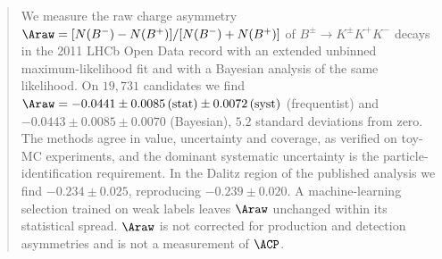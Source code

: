 \begin{abstract}
We measure the raw charge asymmetry $\Araw=[N(B^-)-N(B^+)]/[N(B^-)+N(B^+)]$ of $B^{\pm}\to K^{\pm}K^{+}K^{-}$ decays in the 2011 LHCb Open Data record with an extended unbinned maximum-likelihood fit and with a Bayesian analysis of the same likelihood. On $19{,}731$ candidates we find $\Araw=-0.0441\pm0.0085\,(\text{stat})\pm0.0072\,(\text{syst})$ (frequentist) and $-0.0443\pm0.0085\pm0.0070$ (Bayesian), $5.2$ standard deviations from zero. The methods agree in value, uncertainty and coverage, as verified on toy-MC experiments, and the dominant systematic uncertainty is the particle-identification requirement. In the Dalitz region of the published analysis we find $-0.234\pm0.025$, reproducing $-0.239\pm0.020$. A machine-learning selection trained on weak labels leaves $\Araw$ unchanged within its statistical spread. $\Araw$ is not corrected for production and detection asymmetries and is not a measurement of $\ACP$.
\end{abstract}
